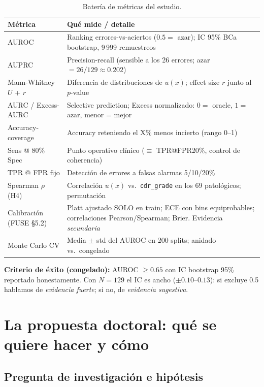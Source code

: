\documentclass[12pt,a4paper]{article}
\newcommand{\ux}{u(x)}
\begin{document}
\begin{table}[H]
\centering
\small
\caption{Batería de métricas del estudio.}
\label{tab:metricas}
\begin{tabularx}{\textwidth}{lX}
\toprule
\textbf{Métrica} & \textbf{Qué mide / detalle} \\
\midrule
AUROC & Ranking errores-vs-aciertos ($0.5 =$ azar); IC 95\% BCa bootstrap, 9\,999 remuestreos \\
AUPRC & Precision-recall (sensible a los 26 errores; azar $= 26/129 \approx 0.202$) \\
Mann-Whitney $U$ + $r$ & Diferencia de distribuciones de $\ux$; effect size $r$ junto al $p$-value \\
AURC / Excess-AURC & Selective prediction; Excess normalizado: $0 =$ oracle, $1 =$ azar, menor = mejor \\
Accuracy-coverage & Accuracy reteniendo el X\% menos incierto (rango 0--1) \\
Sens @ 80\% Spec & Punto operativo clínico ($\equiv$ TPR@FPR20\%, control de coherencia) \\
TPR @ FPR fijo & Detección de errores a falsas alarmas 5/10/20\% \\
Spearman $\rho$ (H4) & Correlación $\ux$ vs.\ \texttt{cdr\_grade} en los 69 patológicos; permutación \\
Calibración (FUSE §5.2) & Platt ajustado SOLO en train; ECE con bins equiprobables; correlaciones Pearson/Spearman; Brier. Evidencia \emph{secundaria} \\
Monte Carlo CV & Media $\pm$ std del AUROC en 200 splits; anidado vs.\ congelado \\
\bottomrule
\end{tabularx}
\end{table}

\textbf{Criterio de éxito (congelado):} AUROC $\geq 0.65$ con IC bootstrap
95\% reportado honestamente. Con $N = 129$ el IC es ancho
($\pm 0.10$--$0.13$): si excluye 0.5 hablamos de \emph{evidencia fuerte};
si no, de \emph{evidencia sugestiva}.

\section{La propuesta doctoral: qué se quiere hacer y cómo}
\label{sec:propuesta}

\subsection{Pregunta de investigación e hipótesis}
\end{document}
